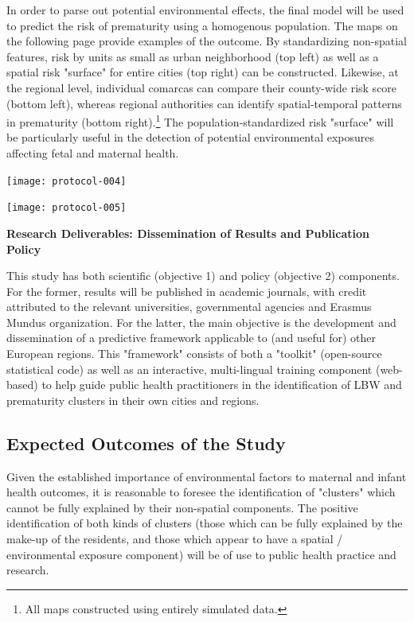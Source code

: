 \documentclass{article}
\begin{document}
\begin{multicols}{2}
In order to parse out potential environmental effects, the final model will be used to predict the risk of prematurity using a homogenous population.  The maps on the following page provide examples of the outcome. By standardizing non-spatial features, risk by units as small as urban neighborhood (top left) as well as a spatial risk "surface" for entire cities (top right) can be constructed.  Likewise, at the regional level, individual comarcas can compare their county-wide risk score (bottom left), whereas regional authorities can identify spatial-temporal patterns in prematurity (bottom right).\footnote{All maps constructed using entirely simulated data.}  The population-standardized risk "surface" will be particularly useful in the detection of potential environmental exposures affecting fetal and maternal health.





\begin{center}
\texttt{[image: protocol-004]}
\end{center}


\begin{center}
\texttt{[image: protocol-005]}
\end{center}




\noindent \textbf{Research Deliverables: Dissemination of Results and Publication Policy}

This study has both scientific (objective 1) and policy (objective 2) components.  For the former, results will be published in academic journals, with credit attributed to the relevant universities, governmental agencies and Erasmus Mundus organization.  For the latter, the main objective is the development and dissemination of a predictive framework applicable to (and useful for) other European regions.  This "framework" consists of both a "toolkit" (open-source statistical code) as well as an interactive, multi-lingual training component (web-based) to help guide public health practitioners in the identification of LBW and prematurity clusters in their own cities and regions.  

\subsection*{Expected Outcomes of the Study}

Given the established importance of environmental factors to maternal and infant health outcomes, it is reasonable to foresee the identification of "clusters" which cannot be fully explained by their non-spatial components.  The positive identification of both kinds of clusters (those which can be fully explained by the make-up of the residents, and those which appear to have a spatial / environmental exposure component) will be of use to public health practice and research.


\end{multicols}
\end{document}
